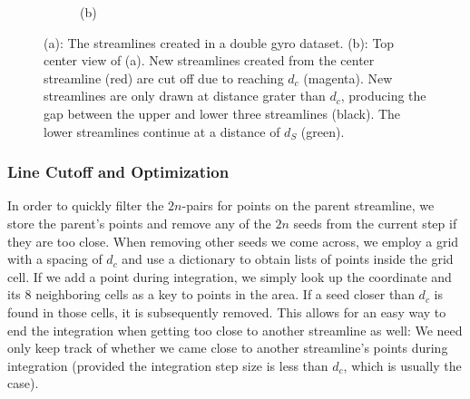 \begin{figure}[ht]
\begin{subfigure}[b]{0.4\textwidth}
        \caption*{(b)}
    \end{subfigure}
    \caption{
        (a): The streamlines created in a double gyro dataset.
        (b): Top center view of (a). New streamlines created from the center streamline (red) are cut off due to reaching $d_c$ (magenta). New streamlines are only drawn at distance grater than $d_c$, producing the gap between the upper and lower three streamlines (black).
        The lower streamlines continue at a distance of $d_S$ (green).
    }
\end{figure}
\subsubsection{Line Cutoff and Optimization}
In order to quickly filter the $2n$-pairs for points on the parent streamline, we store the parent's points and remove any of the $2n$ seeds from the current step if they are too close.
When removing other seeds we come across, we employ a grid with a spacing of $d_c$ and use a dictionary to obtain lists of points inside the grid cell.
If we add a point during integration, we simply look up the coordinate and its 8 neighboring cells as a key to points in the area.
If a seed closer than $d_c$ is found in those cells, it is subsequently removed.
This allows for an easy way to end the integration when getting too close to another streamline as well:
We need only keep track of whether we came close to another streamline's points during integration
(provided the integration step size is less than $d_c$, which is usually the case).

\newpage
